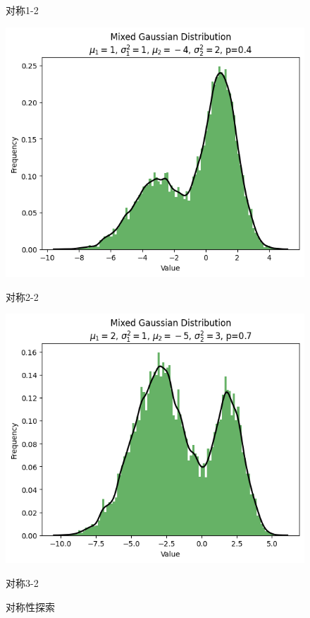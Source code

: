 \documentclass{article}
\begin{document}
\begin{figure}[H]
\begin{minipage}[b]{0.3\linewidth}
        \caption{对称1-2}
    \end{minipage}
    \begin{minipage}[b]{0.3\linewidth}
        \centering
        \includegraphics[width=\linewidth]{figure/对称4.png}
        \caption{对称2-2}
    \end{minipage}
    \hfill
    \begin{minipage}[b]{0.3\linewidth}
        \centering
        \includegraphics[width=\linewidth]{figure/对称6.png}
        \caption{对称3-2}
    \end{minipage}
    \caption{对称性探索}
    \label{fig:对称}
\end{figure}
\end{document}
